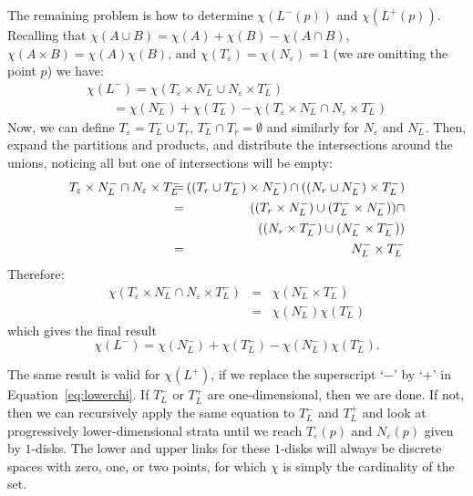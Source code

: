 The remaining problem is how to determine $\chi(L^-(p))$ and
$\chi(L^+(p))$. 
Recalling that $\chi(A \cup B) = \chi(A) + \chi(B) - \chi(A \cap B)$,
$\chi(A\times B)=\chi(A)\chi(B)$, and $\chi(T_\varepsilon)=\chi(N_\varepsilon)=1$ (we are omitting 
the point $p$) we have:
\begin{equation}
\begin{array}{l}
\chi(L^-) = \chi(T_\varepsilon \times N_L^- \cup N_\varepsilon \times T_L^-) \\
    \qquad  = \chi(N_L^-) + \chi(T_L^-) - \chi(T_\varepsilon \times N_L^- \cap N_\varepsilon \times T_L^-)
\end{array}
\end{equation}
Now, we can define $T_\varepsilon = T_L^- \cup T_r,\, T_L^- \cap T_r =
\emptyset$ and similarly for $N_\varepsilon$ and $N_L^-$.  Then,
expand the partitions and products, and distribute the intersections
around the unions, noticing all but one of intersections will be
empty:
\begin{eqnarray*}
T_\varepsilon \times N_L^- \cap N_\varepsilon \times T_L^- \hspace{-8.0px} &=& \hspace{-8.0px} ((T_r \cup T_L^-) \times N_L^-) \cap ((N_r \cup N_L^-) \times T_L^-) \\
\hspace{-8.0px} &=& \hspace{-8.0px} ((T_r \times N_L^-) \cup (T_L^- \times N_L^-)) \cap \\
\hspace{-8.0px} && \hspace{-8.0px}((N_r \times T_L^-) \cup (N_L^- \times T_L^-)) \\
\hspace{-8.0px} &=& \hspace{-8.0px}N_L^- \times T_L^-
\end{eqnarray*}
Therefore:
\begin{eqnarray*}
\chi(T_\varepsilon \times N_L^- \cap N_\varepsilon \times T_L^-) &=& \chi(N_L^- \times T_L^-) \\
&=& \chi(N_L^-)\chi(T_L^-)
\end{eqnarray*}
which gives the final result
\begin{equation}
\chi(L^-) = \chi(N_L^-)+\chi(T_L^-)-\chi(N_L^-)\chi(T_L^-) \label{eq:lowerchi}.
\end{equation}

The same result is valid for $\chi(L^+)$, if we replace the 
superscript `$-$' by `$+$' in Equation~\eqref{eq:lowerchi}. If $T_L^-$ or
$T_L^+$ are one-dimensional, then we are done. If not, then we can
recursively apply the same equation to $T_L^-$ and $T_L^+$ and look at
progressively lower-dimensional strata until we reach
$T_\varepsilon(p)$ and $N_\varepsilon(p)$ given by $1$-disks. The
lower and upper links for these \mbox{$1$-disks} will always be
discrete spaces with zero, one, or two points, for which $\chi$ is
simply the cardinality of the set.

